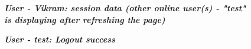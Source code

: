 \begin{figure}[htp]
    \centering
    \caption{\textbf{\textit{ User - Vikram: session data (other online user(s) - "test" is displaying after refreshing the page) }}}
    \label{fig:vikram-session-data-refresh}
\end{figure}

\begin{figure}[htp]
    \centering
    \caption{\textbf{\textit{ User - test: Logout success }}}
    \label{fig:test-logout-success}
\end{figure}

